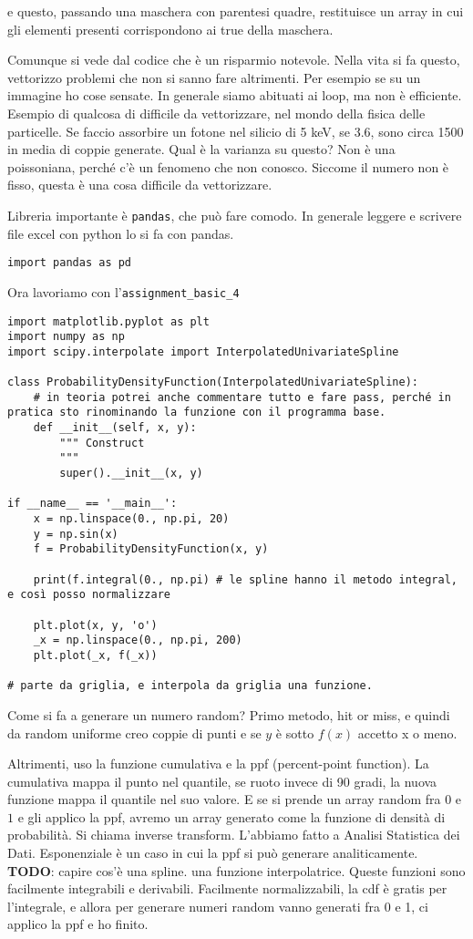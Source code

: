 \documentclass[10pt, a4paper, titlepage]{book}
\begin{document}
e questo, passando una maschera con parentesi quadre, restituisce un array in cui gli elementi presenti corrispondono ai true della maschera.

Comunque si vede dal codice che è un risparmio notevole. Nella vita si fa questo, vettorizzo problemi che non si sanno fare altrimenti.
Per esempio se su un immagine ho cose sensate. In generale siamo abituati ai loop, ma non è efficiente.
Esempio di qualcosa di difficile da vettorizzare, nel mondo della fisica delle particelle.
Se faccio assorbire un fotone nel silicio di 5 keV, se 3.6, sono circa 1500 in media di coppie generate. Qual è la varianza su questo? Non è una poissoniana, perché c'è un fenomeno che non conosco. 
Siccome il numero non è fisso, questa è una cosa difficile da vettorizzare.

Libreria importante è \texttt{pandas}, che può fare comodo.
In generale leggere e scrivere file excel con python lo si fa con pandas.
\begin{verbatim}
import pandas as pd
\end{verbatim}

Ora lavoriamo con l'\texttt{assignment\_basic\_4}

\begin{verbatim}
import matplotlib.pyplot as plt
import numpy as np
import scipy.interpolate import InterpolatedUnivariateSpline

class ProbabilityDensityFunction(InterpolatedUnivariateSpline):
	# in teoria potrei anche commentare tutto e fare pass, perché in pratica sto rinominando la funzione con il programma base.
	def __init__(self, x, y):
		""" Construct
		"""
		super().__init__(x, y)

if __name__ == '__main__':
	x = np.linspace(0., np.pi, 20)
	y = np.sin(x)
	f = ProbabilityDensityFunction(x, y)

	print(f.integral(0., np.pi) # le spline hanno il metodo integral, e così posso normalizzare

	plt.plot(x, y, 'o')
	_x = np.linspace(0., np.pi, 200)
	plt.plot(_x, f(_x))

# parte da griglia, e interpola da griglia una funzione.
\end{verbatim}

Come si fa a generare un numero random? Primo metodo, hit or miss, e quindi da random uniforme creo coppie di punti e se $y$ è sotto $f(x)$ accetto x o meno.

Altrimenti, uso la funzione cumulativa e la ppf (percent-point function). La cumulativa mappa il punto nel quantile, se ruoto invece di 90 gradi, la nuova funzione mappa il quantile nel suo valore.
E se si prende un array random fra $0$ e $1$ e gli applico la ppf, avremo un array generato come la funzione di densità di probabilità. Si chiama inverse transform. L'abbiamo fatto a Analisi Statistica dei Dati. Esponenziale è un caso in cui la ppf si può generare analiticamente.
\textbf{TODO}: capire cos'è una spline. una funzione interpolatrice. Queste funzioni sono facilmente integrabili e derivabili. Facilmente normalizzabili, la cdf è gratis per l'integrale, e allora per generare numeri random vanno generati fra 0 e 1, ci applico la ppf e ho finito.
\end{document}
